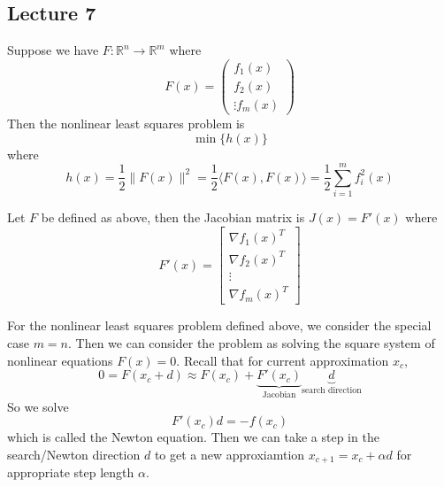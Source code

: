 \subsection{Lecture 7}
\begin{definition}
  Suppose we have $F: \mathbb R^n \to \mathbb R^m$ where $$F(x) = \begin{pmatrix}
    f_1(x) \\ f_2(x) \\ \vdots f_m(x)
  \end{pmatrix}$$ Then the nonlinear least squares problem is $$\min \{h(x)\}$$ where $$h(x) = \frac{1}{2} \|F(x)\|^2 = \frac{1}{2}\langle F(x), F(x) \rangle = \frac{1}{2} \sum^m_{i=1} f_i^2(x)$$
\end{definition}
\begin{definition}
  Let $F$ be defined as above, then the Jacobian matrix is $J(x) = F'(x)$ where $$F'(x) = \begin{bmatrix}
    \nabla f_1(x)^T \\ \nabla f_2(x)^T \\ \vdots \\ \nabla f_m(x)^T
  \end{bmatrix}$$
\end{definition}
\begin{problem}
  For the nonlinear least squares problem defined above, we consider the special case $m = n$. Then we can consider the problem as solving the square system of nonlinear equations $F(x) = 0$. Recall that for current approximation $x_c$, $$0 = F(x_c + d) \approx F(x_c) + \underbrace{F'(x_c)}_{\text{Jacobian}}\underbrace{d}_{\text{search direction}}$$ So we solve $$F'(x_c)d = -f(x_c)$$ which is called the Newton equation. Then we can take a step in the search/Newton direction $d$ to get a new approxiamtion $x_{c+1} = x_c + \alpha d$ for appropriate step length $\alpha$.
\end{problem}